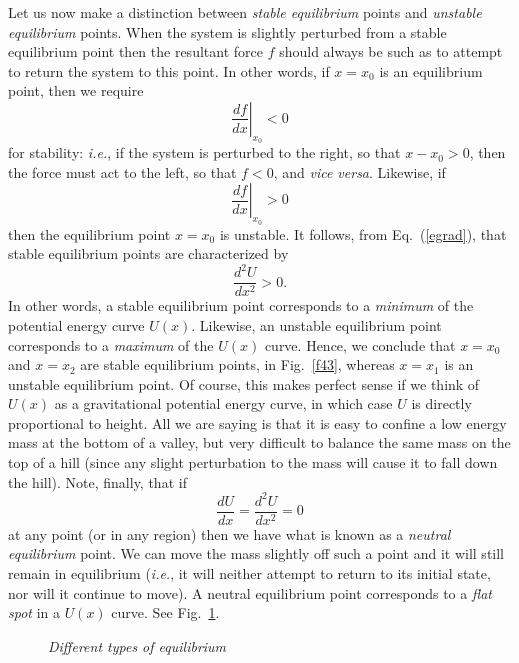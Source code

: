 Let us now make a distinction between {\em stable equilibrium} points
and {\em unstable equilibrium} points. When the system is slightly
perturbed from a stable equilibrium point then the resultant force $f$
should always be such as to attempt to return the system to this point.
In other words, if $x=x_0$ is an equilibrium point, then we require
\begin{equation}
\left.\frac{df}{dx}\right|_{x_0} <0
\end{equation}
for stability: {\em i.e.}, if the system is perturbed to the right, so that $x-x_0>0$,
then the force must act to the left, so that $f <0$, and {\em vice versa}.
Likewise, if 
\begin{equation}
\left.\frac{df}{dx}\right|_{x_0} >0
\end{equation}
then the equilibrium point $x=x_0$ is unstable. It follows, from
 Eq.~(\ref{egrad}), that stable equilibrium points are
characterized by
\begin{equation}
\frac{d^2 U}{dx^2}>0.
\end{equation}
In other words, a stable equilibrium point corresponds to a {\em minimum}
of the potential energy curve $U(x)$. Likewise, an unstable
equilibrium point corresponds to a {\em maximum} of the $U(x)$ curve. Hence,
we conclude that $x=x_0$ and $x=x_2$ are stable equilibrium points,
in Fig.~\ref{f43}, whereas $x=x_1$ is an unstable equilibrium point. 
Of course, this makes perfect sense if we think of $U(x)$ as
a gravitational potential energy curve, in which case $U$ is
directly proportional to height. All we are saying is that it is
easy to confine a low energy mass at the bottom of a valley,
but very difficult to balance the same mass on the top of
a hill (since any slight perturbation to the mass will cause it
to fall down the hill). Note, finally, that if
\begin{equation}
\frac{dU}{dx}=\frac{d^2 U}{dx^2}=0
\end{equation}
at any point (or in any region) then we have what is known as a {\em neutral equilibrium}
point. We can move the mass slightly off such a point and it will still
remain in equilibrium ({\em i.e.}, it will neither attempt to return to
its initial state,  nor will it continue to move). A neutral equilibrium point
corresponds to a {\em flat spot} in a $U(x)$ curve. See Fig.~\ref{f44}.

\begin{figure}
\epsfysize=1.8in
\centerline{}
\caption{\em Different types of equilibrium}\label{f44}   
\end{figure}
 
